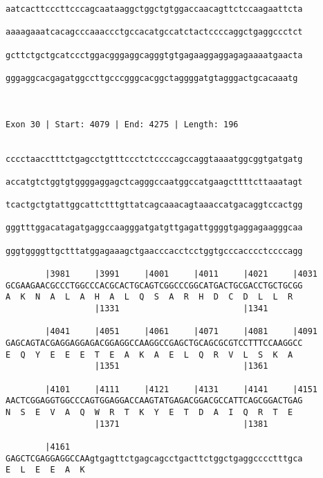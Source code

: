 \documentclass{article}
\begin{document}
\begin{Verbatim}
aatcacttcccttcccagcaataaggctggctgtggaccaacagttctccaagaattcta
                                                            
aaaagaaatcacagcccaaaccctgccacatgccatctactccccaggctgaggccctct
                                                            
gcttctgctgcatccctggacgggaggcagggtgtgagaaggaggagagaaaatgaacta
                                                            
gggaggcacgagatggccttgcccgggcacggctaggggatgtagggactgcacaaatg
                                                           
                                                           
 
Exon 30 | Start: 4079 | End: 4275 | Length: 196


cccctaacctttctgagcctgtttccctctccccagccaggtaaaatggcggtgatgatg
                                                            
accatgtctggtgtggggaggagctcagggccaatggccatgaagcttttcttaaatagt
                                                            
tcactgctgtattggcattctttgttatcagcaaacagtaaaccatgacaggtccactgg
                                                            
gggtttggacatagatgaggccaagggatgatgttgagattggggtgaggagaagggcaa
                                                            
gggtggggttgctttatggagaaagctgaacccacctcctggtgcccacccctccccagg
                                                            
        |3981     |3991     |4001     |4011     |4021     |4031
GCGAAGAACGCCCTGGCCCACGCACTGCAGTCGGCCCGGCATGACTGCGACCTGCTGCGG
A  K  N  A  L  A  H  A  L  Q  S  A  R  H  D  C  D  L  L  R  
                  |1331                         |1341       
  
        |4041     |4051     |4061     |4071     |4081     |4091
GAGCAGTACGAGGAGGAGACGGAGGCCAAGGCCGAGCTGCAGCGCGTCCTTTCCAAGGCC
E  Q  Y  E  E  E  T  E  A  K  A  E  L  Q  R  V  L  S  K  A  
                  |1351                         |1361       
  
        |4101     |4111     |4121     |4131     |4141     |4151
AACTCGGAGGTGGCCCAGTGGAGGACCAAGTATGAGACGGACGCCATTCAGCGGACTGAG
N  S  E  V  A  Q  W  R  T  K  Y  E  T  D  A  I  Q  R  T  E  
                  |1371                         |1381       
  
        |4161                                               
GAGCTCGAGGAGGCCAAgtgagttctgagcagcctgacttctggctgaggcccctttgca
E  L  E  E  A  K                                            
                                                            

\end{Verbatim}
\end{document}
